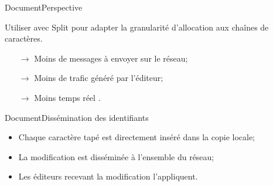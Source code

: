 \begin{frame}{Document}{Perspective}
  
  Utiliser \LSEQ avec \og Split \fg{} pour
  adapter la granularité d'allocation aux chaînes de caractères.
  \vspace{0.75cm}
  \begin{itemize}
  \item [$\rightarrow$] Moins de messages à envoyer sur le réseau;
  \item [$\rightarrow$] Moins de trafic généré par l'éditeur;
  \item [$\rightarrow$] Moins \og temps réel \fg.
  \end{itemize}

\end{frame}

\begin{frame}{Document}{Dissémination des identifiants}

    \hspace{-1cm}
  \begin{minipage}{0.55\textwidth}
    \begin{itemize}
      \vspace{0.5cm}
    \item Chaque caractère tapé est directement inséré dans la copie locale;
    \item La modification est disséminée à l'ensemble du réseau;
    \item Les éditeurs recevant la modification l'appliquent.
    \end{itemize}
  \end{minipage}
  \hfill
  \begin{minipage}{0.44\textwidth}
    \begin{center}
      
    \end{center}
  \end{minipage}

  
  \vspace{1cm}
  \large
  \begin{itemize}
  \end{itemize}

\end{frame}


